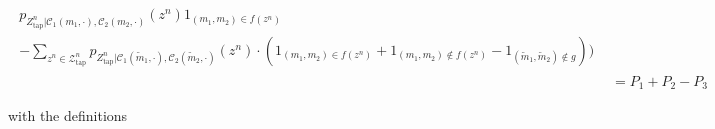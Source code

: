 \documentclass[journal]{IEEEtran}
\newcommand{\codebookpmf}{p}
\newcommand{\channelOut}{Z}
\newcommand{\channelOutAlph}{\mathcal{Z}}
\newcommand{\channelOutAlphElement}{z}
\newcommand{\channelOutAlphWiretapper}{\channelOutAlph_\mathrm{tap}}
\newcommand{\channelOutAlphElementWiretapper}{\channelOutAlphElement}
\newcommand{\channelOutWiretapper}{\channelOut_\mathrm{tap}}
\newcommand{\codebookOne}{\mathcal{C}_1}
\newcommand{\codebookTwo}{\mathcal{C}_2}
\newcommand{\codebookBlocklength}{n}
\newcommand{\indicator}[1]{1_{#1}}
\newcommand{\messageAlphabetElement}{m}
\newcommand{\wiretapperDecoder}{{f}}
\newcommand{\wiretapperGuesser}{{g}}
\newcommand{\semanticTotvarTerm}{{P_1}}
\newcommand{\semanticErrorTermOne}{{P_2}}
\newcommand{\semanticErrorTermTwo}{{P_3}}
\begin{document}
\begin{align}
\begin{aligned}
\codebookpmf_{\channelOutWiretapper^\codebookBlocklength | \codebookOne(\messageAlphabetElement_1, \cdot), \codebookTwo(\messageAlphabetElement_2, \cdot)}(\channelOutAlphElementWiretapper^\codebookBlocklength)
\indicator{(\messageAlphabetElement_1,\messageAlphabetElement_2) \in \wiretapperDecoder(\channelOutAlphElementWiretapper^\codebookBlocklength)}
\\
-
\sum\limits_{\channelOutAlphElementWiretapper^\codebookBlocklength \in \channelOutAlphWiretapper^\codebookBlocklength}
\codebookpmf_{\channelOutWiretapper^\codebookBlocklength | \codebookOne(\tilde{\messageAlphabetElement}_1, \cdot), \codebookTwo(\tilde{\messageAlphabetElement}_2, \cdot)}(\channelOutAlphElementWiretapper^\codebookBlocklength)
\cdot(
  \indicator{(\messageAlphabetElement_1,\messageAlphabetElement_2) \in \wiretapperDecoder(\channelOutAlphElementWiretapper^\codebookBlocklength)}
  +
  \indicator{(\messageAlphabetElement_1,\messageAlphabetElement_2) \notin \wiretapperDecoder(\channelOutAlphElementWiretapper^\codebookBlocklength)}
  -
  \indicator{(\tilde{\messageAlphabetElement}_1,\tilde{\messageAlphabetElement}_2) \notin \wiretapperGuesser}
)
\Bigg)
\end{aligned}
\\
&=
\semanticTotvarTerm + \semanticErrorTermOne - \semanticErrorTermTwo
\label{distinguishing-implies-semantic-end}
\end{align}

with the definitions
\end{document}
